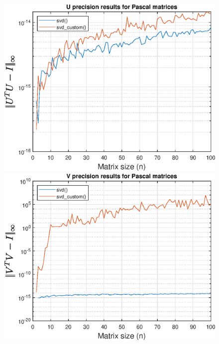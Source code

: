 \begin{figure}[!htb]
\includegraphics[width=\linewidth]{imgs/07_-_U_precision_results_for_Pascal_matrices.eps}
\endminipage\hfill
{}  
\includegraphics[width=\linewidth]{imgs/08_-_V_precision_results_for_Pascal_matrices.eps}
\endminipage\hfill
{}  

\end{figure}
